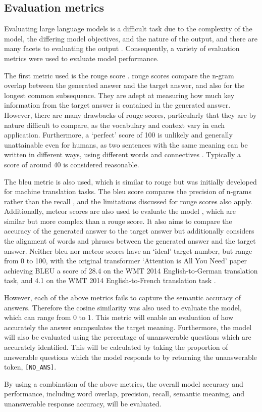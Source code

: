 \subsection{Evaluation metrics}
Evaluating large language models is a difficult task due to the complexity of the model, the differing model objectives, and the nature of the output, and there are many facets to evaluating the output \citep{chang2023survey}. Consequently, a variety of evaluation metrics were used to evaluate model performance.

The first metric used is the \acrshort{rouge} score \citep{lin-2004-rouge}. \acrshort{rouge} scores compare the n-gram overlap between the generated answer and the target answer, and also for the longest common subsequence. They are adept at measuring how much key information from the target answer is contained in the generated answer. However, there are many drawbacks of \acrshort{rouge} scores, particularly that they are by nature difficult to compare, as the vocabulary and context vary in each application. Furthermore, a `perfect' score of 100 is unlikely and generally unattainable even for humans, as two sentences with the same meaning can be written in different ways, using different words and connectives \citep{schluter-2017-limits}. Typically a score of around 40 is considered reasonable.

The \acrshort{bleu} metric is also used, which is similar to \acrshort{rouge} but was initially developed for machine translation tasks. The \acrshort{bleu} score compares the precision of n-grams rather than the recall \citep{papineniBleu}, and the limitations discussed for \acrshort{rouge} scores also apply. Additionally, \acrshort{meteor} scores are also used to evaluate the model \citep{banerjeeMeteor}, which are similar but more complex than a \acrshort{rouge} score. It also aims to compare the accuracy of the generated answer to the target answer but additionally considers the alignment of words and phrases between the generated answer and the target answer. Neither \acrshort{bleu} nor \acrshort{meteor} scores have an `ideal' target number, but range from 0 to 100, with the original transformer `Attention is All You Need' paper achieving BLEU a score of 28.4 on the WMT 2014 English-to-German translation task, and 4.1 on the WMT 2014 English-to-French translation task \cite{vaswani2017attention}.

However, each of the above metrics fails to capture the semantic accuracy of answers. Therefore the cosine similarity was also used to evaluate the model, which can range from 0 to 1. This metric will enable an evaluation of how accurately the answer encapsulates the target meaning. Furthermore, the model will also be evaluated using the percentage of unanswerable questions which are accurately identified. This will be calculated by taking the proportion of answerable questions which the model responds to by returning the unanswerable token, \texttt{[NO\_ANS]}.

By using a combination of the above metrics, the overall model accuracy and performance, including word overlap, precision, recall, semantic meaning, and unanswerable response accuracy, will be evaluated.